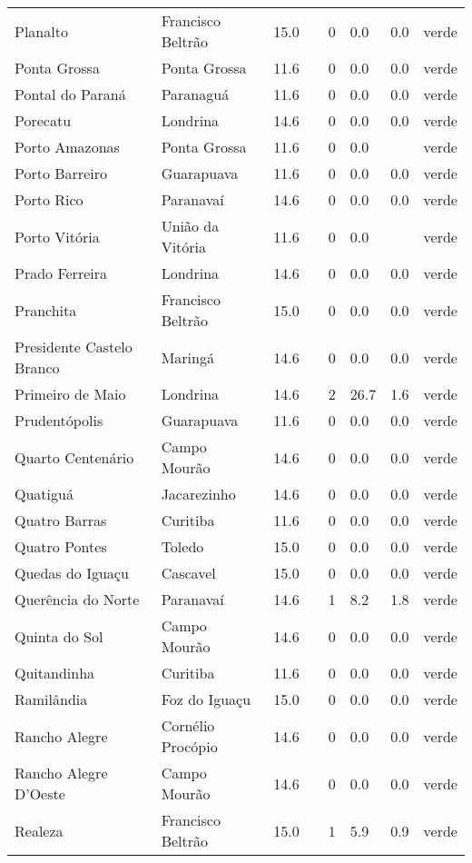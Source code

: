 \begin{longtable}{l|lllllll}
  Planalto & Francisco Beltrão & 15.0 &  & 0 & 0.0 & 0.0 & verde \\ 
  Ponta Grossa & Ponta Grossa & 11.6 &  & 0 & 0.0 & 0.0 & verde \\ 
  Pontal do Paraná & Paranaguá & 11.6 &  & 0 & 0.0 & 0.0 & verde \\ 
  Porecatu & Londrina & 14.6 &  & 0 & 0.0 & 0.0 & verde \\ 
  Porto Amazonas & Ponta Grossa & 11.6 &  & 0 & 0.0 &  & verde \\ 
  Porto Barreiro & Guarapuava & 11.6 &  & 0 & 0.0 & 0.0 & verde \\ 
  Porto Rico & Paranavaí & 14.6 &  & 0 & 0.0 & 0.0 & verde \\ 
  Porto Vitória & União da Vitória & 11.6 &  & 0 & 0.0 &  & verde \\ 
  Prado Ferreira & Londrina & 14.6 &  & 0 & 0.0 & 0.0 & verde \\ 
  Pranchita & Francisco Beltrão & 15.0 &  & 0 & 0.0 & 0.0 & verde \\ 
  Presidente Castelo Branco & Maringá & 14.6 &  & 0 & 0.0 & 0.0 & verde \\ 
  Primeiro de Maio & Londrina & 14.6 &  & 2 & 26.7 & 1.6 & verde \\ 
  Prudentópolis & Guarapuava & 11.6 &  & 0 & 0.0 & 0.0 & verde \\ 
  Quarto Centenário & Campo Mourão & 14.6 &  & 0 & 0.0 & 0.0 & verde \\ 
  Quatiguá & Jacarezinho & 14.6 &  & 0 & 0.0 & 0.0 & verde \\ 
  Quatro Barras & Curitiba & 11.6 &  & 0 & 0.0 & 0.0 & verde \\ 
  Quatro Pontes & Toledo & 15.0 &  & 0 & 0.0 & 0.0 & verde \\ 
  Quedas do Iguaçu & Cascavel & 15.0 &  & 0 & 0.0 & 0.0 & verde \\ 
  Querência do Norte & Paranavaí & 14.6 &  & 1 & 8.2 & 1.8 & verde \\ 
  Quinta do Sol & Campo Mourão & 14.6 &  & 0 & 0.0 & 0.0 & verde \\ 
  Quitandinha & Curitiba & 11.6 &  & 0 & 0.0 & 0.0 & verde \\ 
  Ramilândia & Foz do Iguaçu & 15.0 &  & 0 & 0.0 & 0.0 & verde \\ 
  Rancho Alegre & Cornélio Procópio & 14.6 &  & 0 & 0.0 & 0.0 & verde \\ 
  Rancho Alegre D'Oeste & Campo Mourão & 14.6 &  & 0 & 0.0 & 0.0 & verde \\ 
  Realeza & Francisco Beltrão & 15.0 &  & 1 & 5.9 & 0.9 & verde \\ 

\end{longtable}
